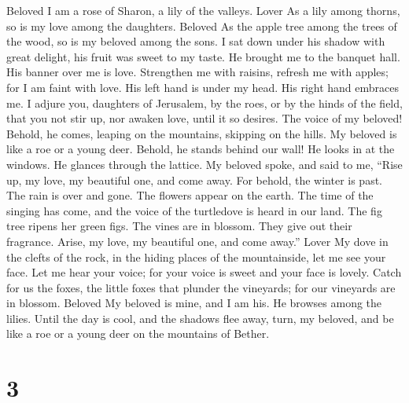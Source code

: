 Beloved  I am a rose of Sharon, a lily of the valleys. Lover
 As a lily among thorns, so is my love among the daughters.
Beloved  As the apple tree among the trees of the wood, so
is my beloved among the sons. I sat down under his shadow with great
delight, his fruit was sweet to my taste.  He brought me to
the banquet hall. His banner over me is love.  Strengthen me
with raisins, refresh me with apples; for I am faint with love.
 His left hand is under my head. His right hand embraces me.
 I adjure you, daughters of Jerusalem, by the roes, or by
the hinds of the field, that you not stir up, nor awaken love, until it
so desires.  The voice of my beloved! Behold, he comes,
leaping on the mountains, skipping on the hills.  My beloved
is like a roe or a young deer. Behold, he stands behind our wall! He
looks in at the windows. He glances through the lattice. 
My beloved spoke, and said to me, ``Rise up, my love, my beautiful one,
and come away.  For behold, the winter is past. The rain is
over and gone.  The flowers appear on the earth. The time
of the singing has come, and the voice of the turtledove is heard in our
land.  The fig tree ripens her green figs. The vines are in
blossom. They give out their fragrance. Arise, my love, my beautiful
one, and come away.'' Lover  My dove in the clefts of the
rock, in the hiding places of the mountainside, let me see your face.
Let me hear your voice; for your voice is sweet and your face is lovely.
 Catch for us the foxes, the little foxes that plunder the
vineyards; for our vineyards are in blossom. Beloved  My
beloved is mine, and I am his. He browses among the lilies.
 Until the day is cool, and the shadows flee away, turn, my
beloved, and be like a roe or a young deer on the mountains of Bether.

\hypertarget{section-2}{%
\section{3}\label{section-2}}

